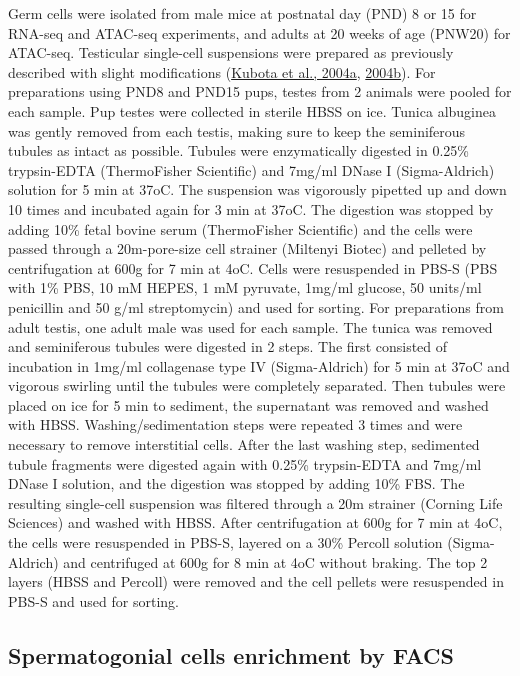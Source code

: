 \documentclass[12pt,twoside]{reedthesis}
\begin{document}
Germ cells were isolated from male mice at postnatal day (PND) 8 or 15
for RNA-seq and ATAC-seq experiments, and adults at 20 weeks of age
(PNW20) for ATAC-seq. Testicular single-cell suspensions were prepared
as previously described with slight modifications (\protect\hyperlink{ref-kubota2004a}{Kubota et al., 2004a}, \protect\hyperlink{ref-kubota2004}{2004b}). For preparations using PND8 and PND15 pups, testes from 2
animals were pooled for each sample. Pup testes were collected in
sterile HBSS on ice. Tunica albuginea was gently removed from each
testis, making sure to keep the seminiferous tubules as intact as
possible. Tubules were enzymatically digested in 0.25\% trypsin-EDTA
(ThermoFisher Scientific) and 7mg/ml DNase I (Sigma-Aldrich) solution
for 5 min at 37oC. The suspension was vigorously pipetted up and down 10
times and incubated again for 3 min at 37oC. The digestion was stopped
by adding 10\% fetal bovine serum (ThermoFisher Scientific) and the cells
were passed through a 20\textmu m-pore-size cell strainer (Miltenyi
Biotec) and pelleted by centrifugation at 600g for 7 min at 4oC. Cells
were resuspended in PBS-S (PBS with 1\% PBS, 10 mM HEPES, 1 mM pyruvate,
1mg/ml glucose, 50 units/ml penicillin and 50 \textmu g/ml streptomycin)
and used for sorting. For preparations from adult testis, one adult male
was used for each sample. The tunica was removed and seminiferous
tubules were digested in 2 steps. The first consisted of incubation in
1mg/ml collagenase type IV (Sigma-Aldrich) for 5 min at 37oC and
vigorous swirling until the tubules were completely separated. Then
tubules were placed on ice for 5 min to sediment, the supernatant was
removed and washed with HBSS. Washing/sedimentation steps were repeated
3 times and were necessary to remove interstitial cells. After the last
washing step, sedimented tubule fragments were digested again with 0.25\%
trypsin-EDTA and 7mg/ml DNase I solution, and the digestion was stopped
by adding 10\% FBS. The resulting single-cell suspension was filtered
through a 20\textmu m strainer (Corning Life Sciences) and washed with
HBSS. After centrifugation at 600g for 7 min at 4oC, the cells were
resuspended in PBS-S, layered on a 30\% Percoll solution (Sigma-Aldrich)
and centrifuged at 600g for 8 min at 4oC without braking. The top 2
layers (HBSS and Percoll) were removed and the cell pellets were
resuspended in PBS-S and used for sorting.

\hypertarget{spermatogonial-cells-enrichment-by-facs}{%
\subsection{Spermatogonial cells enrichment by FACS}\label{spermatogonial-cells-enrichment-by-facs}}
\end{document}

